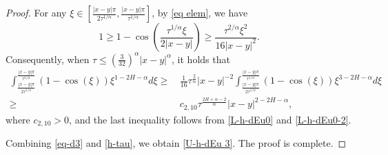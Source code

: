 \documentclass[10pt,a4paper]{amsart}
\begin{document}
\begin{proof}
For any  $  \xi \in  \left[\frac{|x-y|\pi}{2\tau^{1/\alpha}},  \frac{|x-y|\pi}{\tau^{1/\alpha}} \right]$, by \eqref{eq elem},  we have
    \[
  1 \ge    1 - \cos\left(\frac{\tau^{1/\alpha}\xi}{2|x-y|}\right) \ge \frac{\tau^{2/\alpha}\xi^2}{16|x-y|^2}.
    \]
    Consequently, when $\tau \leq \left(\frac{3}{32}\right)^\alpha   |x-y|^{\alpha}$, it holds that
     \begin{equation}\label{h-tau}
\begin{split}
   \int_{\frac{|x-y|\pi}{2\tau^{1/\alpha}}}^{\frac{|x-y|\pi}{\tau^{1/\alpha}}} \left( 1-\cos(\xi)\right) \xi^{1-2H-\alpha}d\xi
\ge &\,  \frac{1}{16}\tau^{\frac{2}{\alpha}}|x-y|^{-2}
\int_{\frac{|x-y|\pi}{2\tau^{1/\alpha}}}^{\frac{|x-y|\pi}{\tau^{1/\alpha}}}
\left( 1-\cos(\xi)\right) \xi^{3-2H-\alpha}d\xi\\
\geq&\, c_{2,10} \tau^{\frac{2H+\alpha-2}{\alpha}}|x-y|^{2-2H-\alpha},
      \end{split}
\end{equation}
   where $c_{2,10}>0$, and the last inequality follows from \eqref{L-h-dEu0} and \eqref{L-h-dEu0-2}.

Combining \eqref{eq-d3} and \eqref{h-tau}, we obtain \eqref{U-h-dEu 3}. The proof is complete.
 \end{proof}
\end{document}
